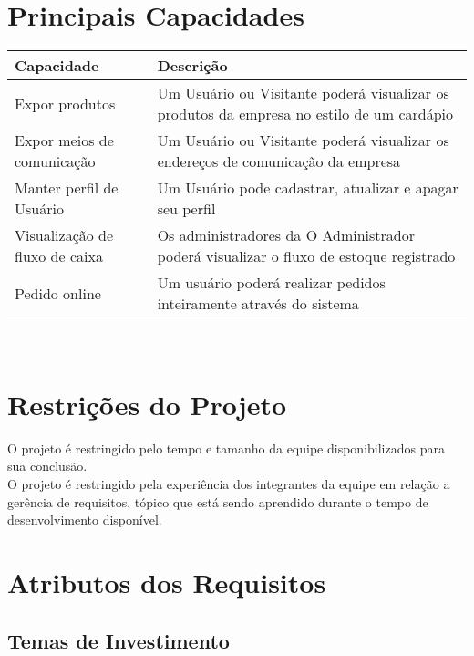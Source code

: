 \begin{apendicesenv}
\begin{itemize}
\end{itemize}




{\large {\section { Principais Capacidades\\ } } }

\begin{tabular}{|l|p{3in}|}
  \hline
  \textbf{Capacidade} & \textbf{Descrição} \\ \hline
  Expor produtos & Um Usuário ou Visitante poderá visualizar os produtos da empresa no estilo de um cardápio \\ \hline
  Expor meios de comunicação & Um Usuário ou Visitante poderá visualizar os endereços de comunicação da empresa \\ \hline
  Manter perfil de Usuário & Um Usuário pode cadastrar, atualizar e apagar seu perfil \\ \hline
  Visualização de fluxo de caixa & Os administradores da O Administrador poderá visualizar o fluxo de estoque registrado \\ \hline
  Pedido online & Um usuário poderá realizar pedidos inteiramente através do sistema \\ \hline

\end{tabular}
\tab \\

{\large {\section { Restrições do Projeto\\ } } }

O projeto é restringido pelo tempo e tamanho da equipe disponibilizados para sua conclusão.\\
\tab O projeto é restringido pela experiência dos integrantes da equipe em relação a gerência de requisitos, tópico que está sendo aprendido durante o tempo de desenvolvimento disponível.\\
{\large {\section { Atributos dos Requisitos\\ } } }

{\large {\subsection { Temas de Investimento\\ } } }



\end{apendicesenv}
